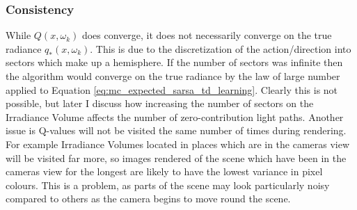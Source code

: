 \documentclass[ %
                    author={Callum Pearce},
                supervisor={Dr. Neill Campbell},
                    degree={MEng},
                     title={How effective are Temporal difference learning methods for reducing the number of zero contribution light paths, while still accurately approximating Global Illumination in Path tracing?},
                  subtitle={},
                      type={research},
                      year={2019} ]{dissertation}
\begin{document}
\subsubsection{Consistency}
While $Q(x, \omega_k)$ does converge, it does not necessarily converge on the true radiance $q_*(x, \omega_k)$. This is due to the discretization of the action/direction into sectors which make up a hemisphere. If the number of sectors was infinite then the algorithm would converge on the true radiance by the law of large number applied to Equation \ref{eq:mc_expected_sarsa_td_learning}. Clearly this is not possible, but later I discuss how increasing the number of  sectors on the Irradiance Volume affects the number of zero-contribution light paths. Another issue is Q-values will not be visited the same number of times during rendering. For example Irradiance Volumes located in places which are in the cameras view will be visited far more, so images rendered of the scene which have been in the cameras view for the longest are likely to have the lowest variance in pixel colours. This is a problem, as parts of the scene may look particularly noisy compared to others as the camera begins to move round the scene.

\end{document}
